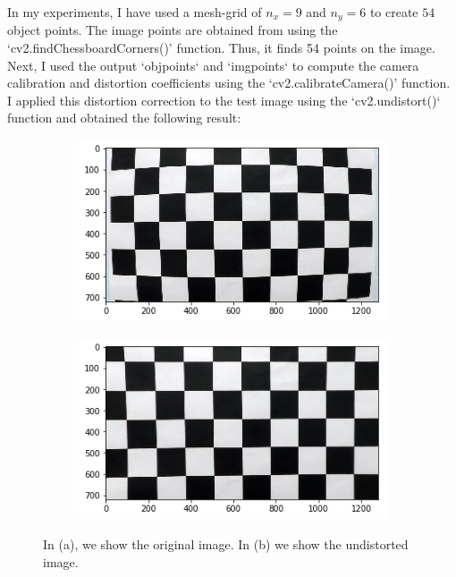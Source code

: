\documentclass[draftcls,onecolumn,12pt]{IEEEtran}
\theoremstyle{plain}
\theoremstyle{plain}
\begin{document}
In my experiments, I have used a mesh-grid of $n_x = 9$ and $n_y = 6$ to create $54$ object points. The image points are obtained from using the `cv2.findChessboardCorners()' function. Thus, it finds 54 points on the image. Next, I used the output `objpoints` and `imgpoints` to compute the camera calibration and distortion coefficients using the `cv2.calibrateCamera()' function. I applied this distortion correction to the test image using the `cv2.undistort()` function and obtained the following result:
\begin{figure}[htb!!]
    \centering
   \begin{subfigure}[t]{0.45\textwidth}
        \includegraphics[width=\textwidth]{./figures/chessboard.png}\\
        \caption{}
    \end{subfigure}
    \hspace{-0.5cm}
    \begin{subfigure}[t]{0.45\textwidth}
        \includegraphics[width=\textwidth]{./figures/undistorted_chessboard.png}\\
        \caption{}
    \end{subfigure}
    \caption{In (a), we show the original image. In (b) we show the undistorted image.}\label{Fig:Chessboard}
\end{figure}
\end{document}
